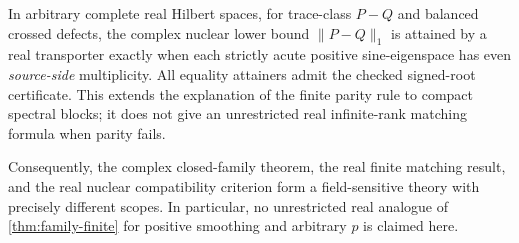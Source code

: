 In arbitrary complete real Hilbert spaces, for trace-class
$P-Q$ and balanced crossed defects, the complex nuclear lower bound
$\|P-Q\|_1$ is attained by a real transporter exactly when each
strictly acute positive sine-eigenspace has even \emph{source-side}
multiplicity.  All equality attainers admit the checked signed-root
certificate.  This extends the explanation of the finite parity rule
to compact spectral blocks; it does not give an unrestricted real
infinite-rank matching formula when parity fails.

Consequently, the complex closed-family theorem, the real finite
matching result, and the real nuclear compatibility criterion form a
field-sensitive theory with precisely different scopes.  In particular,
no unrestricted real analogue of \cref{thm:family-finite} for positive
smoothing and arbitrary $p$ is claimed here.
